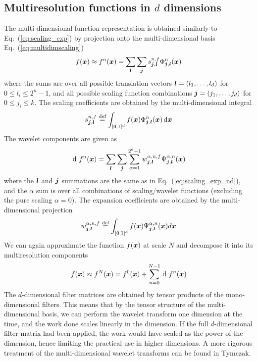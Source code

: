 \subsection{Multiresolution functions in $d$ dimensions}
The multi-dimensional function representation is obtained similarly to
Eq.~(\ref{eq:scaling_exp}) by projection onto the multi-dimensional basis
Eq.~(\ref{eq:multidimscaling})
\begin{equation}
    \label{eq:scaling_exp_nd}
    f(\boldsymbol x) \approx {f}^{n}(\boldsymbol x) = \sum_{\boldsymbol l}
    \sum_{\boldsymbol j} s^{n,f}_{\boldsymbol j,\boldsymbol l} 
    \Phi^n_{\boldsymbol j,\boldsymbol l}(\boldsymbol x)
\end{equation}
where the sums are over all possible translation vectors 
$\boldsymbol l = (l_1,\dots,l_d)$ for $0\leq l_i\leq 2^n-1$, and all possible 
scaling function combinations $\boldsymbol j = (j_1,\dots,j_d)$ for 
$0\leq j_i\leq k$. The scaling coefficients are obtained by the
multi-dimensional integral
\begin{equation}
    \label{eq:waveletproj_nd}
    s^{n,f}_{\boldsymbol j,\boldsymbol l} \stackrel{\text{def}}{\hbox{=}}
    \int_{[0,1]^d}f(\boldsymbol x)\Phi^n_{\boldsymbol j,
    \boldsymbol l}(\boldsymbol x)\,\mathrm{d} \boldsymbol x
\end{equation}
The wavelet components are given as
\begin{equation}
    \waveletrep{f}{n}(\bs{x}) = \sum_{\bs{l}} \sum_{\bs{j}} 
    \sum_{\alpha=1}^{2^d-1}\waveletcoef^{\alpha,n,f}_{\bs{j},\bs{l}} 
	\waveletnd^{\alpha,n}_{\bs{j},\bs{l}}(\bs{x})
\end{equation}
where the $\boldsymbol l$ and $\boldsymbol j$ summations are the same as in
Eq.~(\ref{eq:scaling_exp_nd}), and the $\alpha$ sum is over all combinations of
scaling/wavelet functions (excluding the pure scaling $\alpha=0$).
The expansion coefficients are obtained by the multi-dimensional projection
\begin{equation}
    w^{\alpha,n,f}_{\boldsymbol j,\boldsymbol l} \stackrel{\text{def}}{\hbox{=}}
	\int_{[0,1]^d}f(\boldsymbol x)\Psi^{\alpha,n}_{\boldsymbol j,
	\boldsymbol l}(\boldsymbol x)d\boldsymbol x
\end{equation}
We can again approximate the function $f(\boldsymbol x)$ at scale $N$ and 
decompose it into its multiresolution components
\begin{equation}
    f(\bs{x}) \approx \scalingrep{f}{N}(\bs{x}) = 
    \scalingrep{f}{0}(\bs{x}) + \sum_{n=0}^{N-1} \waveletrep{f}{n}(\bs{x})
\end{equation}
The $d$-dimensional filter matrices are obtained by tensor products of the
mono-dimensional filters. This means that by the tensor structure of
the multi-dimensional basis, we can perform the wavelet transform one dimension 
at the time, and the work done scales linearly in the dimension. If the full
$d$-dimensional filter matrix had been applied, the work would have scaled
as the power of the dimension, hence limiting the practical use in higher
dimensions. A more rigorous treatment of the multi-dimensional wavelet
transforms can be found in Tymczak\cite{Tymczak}.

